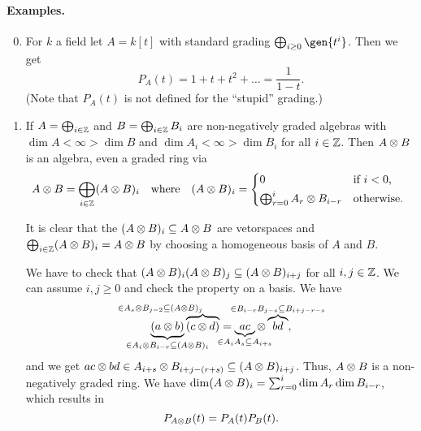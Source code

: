\documentclass[12pt,a4paper]{scrartcl}
\theoremstyle{cplain}
\theoremstyle{cplain}
\theoremstyle{cplain}
\theoremstyle{definition}
\begin{document}
\begin{otherlanguage}{english}
\paragraph{Examples.}
\begin{enumerate}
  \setcounter{enumi}{-1}
  \item\label{ex:hs:1} For $k$ a field let $A = k[t]$ with standard grading $\bigoplus_{i\ge0}\gen{t^i}$. Then we get \[ P_A(t) = 1+t+t^2+\ldots = \frac1{1-t}. \] (Note that $P_A(t)$ is not defined for the \enquote{stupid} grading.)
  \item If $A=\bigoplus_{i\in\mathbb Z}$ and $B = \bigoplus_{i\in\mathbb Z}B_i$ are non-negatively graded algebras with $\dim A< \infty>\dim B$ and $\dim A_i <\infty>\dim B_i$ for all $i \in \mathbb Z$. Then $A \otimes B$ is an algebra, even a graded ring via \[ A \tp B = \bigoplus_{i\in \IZ} (A\tp B)_i \quad\text{where}\quad (A\tp B)_i = 
  \begin{cases*}
    0 & if $i < 0$, \\
    \bigoplus_{r=0}^i A_r \tp B_{i-r} & \text{otherwise}.
  \end{cases*}
  \]
  
  It is clear that the $(A\otimes B)_i \subseteq A\otimes B$ are vetorspaces and $\bigoplus_{i\in\mathbb Z}(A\otimes B)_i = A\otimes B$ by choosing a homogeneous basis of $A$ and $B$.
  
  We have to check that $(A \otimes B)_i(A\otimes B)_j \subseteq (A\otimes B)_{i+j}$ for all $i,j \in \mathbb Z$. We can assume $i,j \ge 0$ and check the property on a basis. We have \[\underbrace{(a \tp b)}_{\mathclap{\in A_i\tp B_{i-r} \subseteq (A \tp B)_i}}\overbrace{(c \tp d)}^{\mathllap{\in A_s \tp B_{j-2}\subseteq (A \tp B)_j}} = \underbrace{ac}_{\mathclap{\in A_iA_s \subseteq A_{i+s}}} \tp \overbrace{bd}^{\mathclap{\in B_{i-r}B_{j-s} \subseteq B_{i+j-r-s}}}, \] and we get $ac \otimes bd \in A_{i+s}\otimes B_{i+j-(r+s)} \subseteq (A \otimes B)_{i+j}$. Thus, $A\otimes B$ is a non-negatively graded ring. We have $\dim(A \otimes B)_i = \sum_{r=0}^i\dim A_r \dim B_{i-r}$, which results in \[ P_{A \otimes B}(t) = P_A(t)P_B(t). \]
  

\end{enumerate}
\end{otherlanguage}
\end{document}
